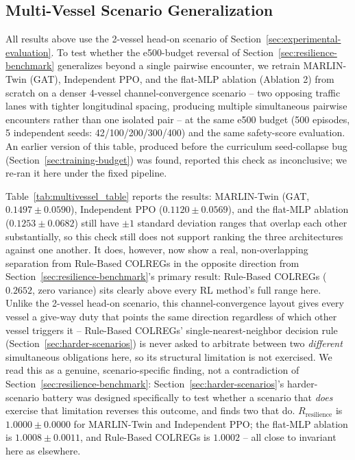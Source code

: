\documentclass[journal,twocolumn,10pt]{IEEEtran}
\begin{document}
\subsection{Multi-Vessel Scenario Generalization}
\label{sec:multivessel}
All results above use the 2-vessel head-on scenario of Section~\ref{sec:experimental-evaluation}. To test whether the e500-budget reversal of Section~\ref{sec:resilience-benchmark} generalizes beyond a single pairwise encounter, we retrain MARLIN-Twin (GAT), Independent PPO, and the flat-MLP ablation (Ablation 2) from scratch on a denser 4-vessel channel-convergence scenario -- two opposing traffic lanes with tighter longitudinal spacing, producing multiple simultaneous pairwise encounters rather than one isolated pair -- at the same e500 budget (500 episodes, 5 independent seeds: 42/100/200/300/400) and the same safety-score evaluation. An earlier version of this table, produced before the curriculum seed-collapse bug (Section~\ref{sec:training-budget}) was found, reported this check as inconclusive; we re-ran it here under the fixed pipeline.

Table~\ref{tab:multivessel_table} reports the results: MARLIN-Twin (GAT, $0.1497 \pm 0.0590$), Independent PPO ($0.1120 \pm 0.0569$), and the flat-MLP ablation ($0.1253 \pm 0.0682$) still have $\pm 1$ standard deviation ranges that overlap each other substantially, so this check still does not support ranking the three architectures against one another. It does, however, now show a real, non-overlapping separation from Rule-Based COLREGs in the opposite direction from Section~\ref{sec:resilience-benchmark}'s primary result: Rule-Based COLREGs ($0.2652$, zero variance) sits clearly above every RL method's full range here. Unlike the 2-vessel head-on scenario, this channel-convergence layout gives every vessel a give-way duty that points the same direction regardless of which other vessel triggers it -- Rule-Based COLREGs' single-nearest-neighbor decision rule (Section~\ref{sec:harder-scenarios}) is never asked to arbitrate between two \emph{different} simultaneous obligations here, so its structural limitation is not exercised. We read this as a genuine, scenario-specific finding, not a contradiction of Section~\ref{sec:resilience-benchmark}: Section~\ref{sec:harder-scenarios}'s harder-scenario battery was designed specifically to test whether a scenario that \emph{does} exercise that limitation reverses this outcome, and finds two that do. $R_{\text{resilience}}$ is $1.0000 \pm 0.0000$ for MARLIN-Twin and Independent PPO; the flat-MLP ablation is $1.0008 \pm 0.0011$, and Rule-Based COLREGs is $1.0002$ -- all close to invariant here as elsewhere.
\end{document}
